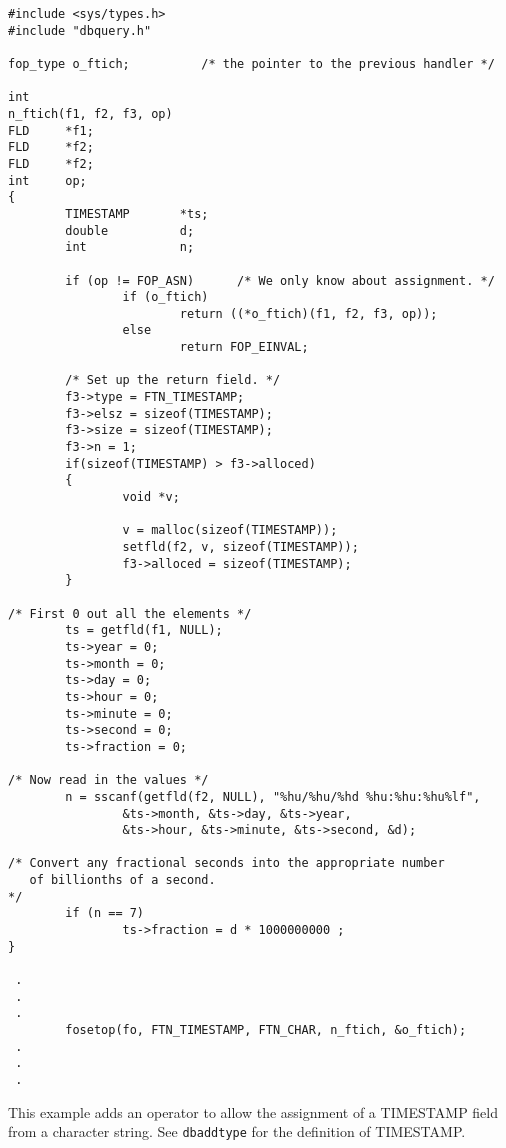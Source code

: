 \EXAMPLE
\begin{verbatim}
#include <sys/types.h>
#include "dbquery.h"

fop_type o_ftich;          /* the pointer to the previous handler */

int
n_ftich(f1, f2, f3, op)
FLD     *f1;
FLD     *f2;
FLD     *f2;
int     op;
{
        TIMESTAMP       *ts;
        double          d;
        int             n;

        if (op != FOP_ASN)      /* We only know about assignment. */
                if (o_ftich)
                        return ((*o_ftich)(f1, f2, f3, op));
                else
                        return FOP_EINVAL;

        /* Set up the return field. */
        f3->type = FTN_TIMESTAMP;
        f3->elsz = sizeof(TIMESTAMP);
        f3->size = sizeof(TIMESTAMP);
        f3->n = 1;
        if(sizeof(TIMESTAMP) > f3->alloced)
        {
                void *v;

                v = malloc(sizeof(TIMESTAMP));
                setfld(f2, v, sizeof(TIMESTAMP));
                f3->alloced = sizeof(TIMESTAMP);
        }

/* First 0 out all the elements */
        ts = getfld(f1, NULL);
        ts->year = 0;
        ts->month = 0;
        ts->day = 0;
        ts->hour = 0;
        ts->minute = 0;
        ts->second = 0;
        ts->fraction = 0;

/* Now read in the values */
        n = sscanf(getfld(f2, NULL), "%hu/%hu/%hd %hu:%hu:%hu%lf",
                &ts->month, &ts->day, &ts->year,
                &ts->hour, &ts->minute, &ts->second, &d);

/* Convert any fractional seconds into the appropriate number
   of billionths of a second.
*/
        if (n == 7)
                ts->fraction = d * 1000000000 ;
}

 .
 .
 .
        fosetop(fo, FTN_TIMESTAMP, FTN_CHAR, n_ftich, &o_ftich);
 .
 .
 .
\end{verbatim}

This example adds an operator to allow the assignment of a TIMESTAMP
field from a character string.  See {\tt dbaddtype} for the definition
of TIMESTAMP.
